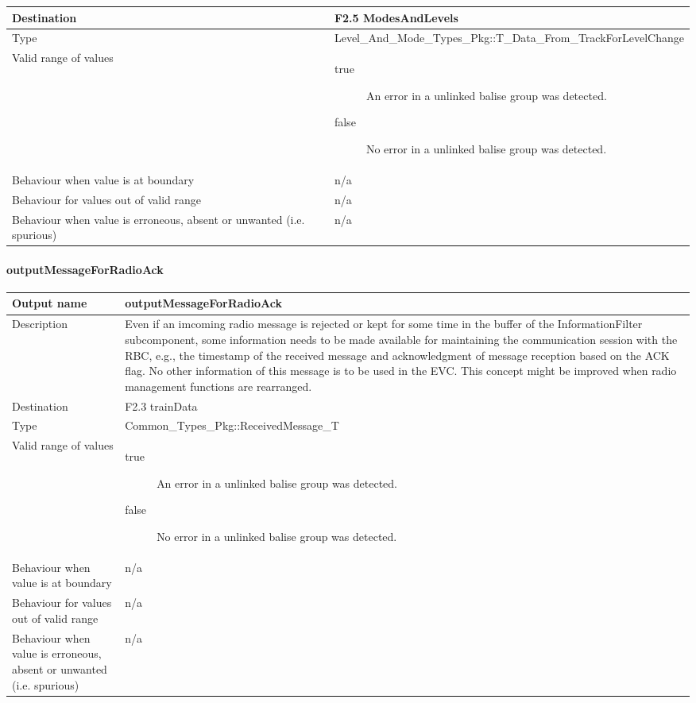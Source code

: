 \begin{longtable}{p{}p{}}
\\
\midrule
Destination				& F2.5 ModesAndLevels
\\ 
\midrule
Type					& Level\_And\_Mode\_Types\_Pkg::T\_Data\_From\_TrackForLevelChange\\
\midrule
Valid range of values	& \begin{description}
\item[true] An error in a unlinked balise group was detected.
\item[false] No error in a unlinked balise group was detected.
\end{description} \\
\midrule
Behaviour when value is at boundary	& n/a\\
\midrule
Behaviour for values out of valid range	& n/a\\
\midrule
Behaviour when value is erroneous, absent or unwanted (i.e. spurious) & n/a\\
\bottomrule
\end{longtable}


\paragraph{outputMessageForRadioAck}

\begin{longtable}{p{}p{}}
\toprule
Output name				& outputMessageForRadioAck \\
\midrule
Description				& Even if an imcoming radio message is rejected or kept for some time in the buffer of the InformationFilter subcomponent, some information needs to be made available for maintaining the communication session with the RBC, e.g., the timestamp of the received message and acknowledgment of message reception based on the ACK flag. No other information of this message is to be used in the EVC. This concept might be improved when radio management functions are rearranged.
\\
\midrule
Destination				& F2.3 trainData\\ 
\midrule
Type					& Common\_Types\_Pkg::ReceivedMessage\_T \\
\midrule
Valid range of values	& \begin{description}
\item[true] An error in a unlinked balise group was detected.
\item[false] No error in a unlinked balise group was detected.
\end{description} \\
\midrule
Behaviour when value is at boundary	& n/a\\
\midrule
Behaviour for values out of valid range	& n/a\\
\midrule
Behaviour when value is erroneous, absent or unwanted (i.e. spurious) & n/a\\
\bottomrule
\end{longtable}


